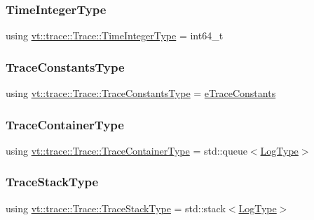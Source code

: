 \subsubsection{\texorpdfstring{Time\+Integer\+Type}{TimeIntegerType}}
{\footnotesize\ttfamily using \hyperlink{structvt_1_1trace_1_1_trace_ab8db9218a8ab87f59773fcbf81433787}{vt\+::trace\+::\+Trace\+::\+Time\+Integer\+Type} =  int64\+\_\+t}

\mbox{\label{structvt_1_1trace_1_1_trace_accb35b20499dfdd46e6c79daae9fc265}} 
\subsubsection{\texorpdfstring{Trace\+Constants\+Type}{TraceConstantsType}}
{\footnotesize\ttfamily using \hyperlink{namespacevt_1_1trace_acf454dfbd581b0ebae895f90b5927a1d}{vt\+::trace\+::\+Trace\+::\+Trace\+Constants\+Type} =  \hyperlink{namespacevt_1_1trace_acf454dfbd581b0ebae895f90b5927a1d}{e\+Trace\+Constants}}

\mbox{\label{structvt_1_1trace_1_1_trace_a9d07ee9d9e92f63674da9954cfe9830b}} 
\subsubsection{\texorpdfstring{Trace\+Container\+Type}{TraceContainerType}}
{\footnotesize\ttfamily using \hyperlink{structvt_1_1trace_1_1_trace_a9d07ee9d9e92f63674da9954cfe9830b}{vt\+::trace\+::\+Trace\+::\+Trace\+Container\+Type} =  std\+::queue$<$\hyperlink{structvt_1_1trace_1_1_trace_a43306d96a91e49db081eaea016f1dd0a}{Log\+Type}$>$}

\mbox{\label{structvt_1_1trace_1_1_trace_ade12ee481e9ac72e94fe614ed03aa0dc}} 
\subsubsection{\texorpdfstring{Trace\+Stack\+Type}{TraceStackType}}
{\footnotesize\ttfamily using \hyperlink{structvt_1_1trace_1_1_trace_ade12ee481e9ac72e94fe614ed03aa0dc}{vt\+::trace\+::\+Trace\+::\+Trace\+Stack\+Type} =  std\+::stack$<$\hyperlink{structvt_1_1trace_1_1_trace_a43306d96a91e49db081eaea016f1dd0a}{Log\+Type}$>$}




